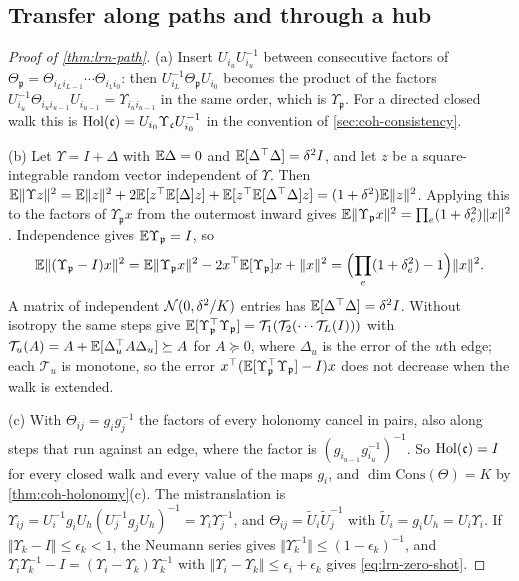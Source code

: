 \subsection{Transfer along paths and through a hub}

\begin{proof}[Proof of \cref{thm:lrn-path}]
(a) Insert $U_{i_u}U_{i_u}^{-1}$ between consecutive factors of $\Theta_{\mathfrak p}=\Theta_{i_Li_{L-1}}\cdots\Theta_{i_1i_0}$: then $U_{i_L}^{-1}\Theta_{\mathfrak p}U_{i_0}$ becomes the product of the factors $U_{i_u}^{-1}\Theta_{i_ui_{u-1}}U_{i_{u-1}}=\Upsilon_{i_ui_{u-1}}$ in the same order, which is $\Upsilon_{\mathfrak p}$. For a directed closed walk this is $\operatorname{Hol}(\mathfrak c)=U_{i_0}\Upsilon_{\mathfrak c}U_{i_0}^{-1}$ in the convention of \cref{sec:coh-consistency}.

(b) Let $\Upsilon=I+\Delta$ with $\mathbb{E}\Delta=0$ and $\mathbb{E}[\Delta^\top\Delta]=\delta^2I$, and let $z$ be a square-integrable random vector independent of $\Upsilon$. Then $\mathbb{E}\Vert\Upsilon z\Vert^2=\mathbb{E}\Vert z\Vert^2+2\mathbb{E}[z^\top\mathbb{E}[\Delta]z]+\mathbb{E}[z^\top\mathbb{E}[\Delta^\top\Delta]z]=(1+\delta^2)\mathbb{E}\Vert z\Vert^2$. Applying this to the factors of $\Upsilon_{\mathfrak p}x$ from the outermost inward gives $\mathbb{E}\Vert\Upsilon_{\mathfrak p}x\Vert^2=\prod_e(1+\delta_e^2)\Vert x\Vert^2$. Independence gives $\mathbb{E}\Upsilon_{\mathfrak p}=I$, so
\begin{equation}\label{eq:lrn-path-proof}
\mathbb{E}\Vert(\Upsilon_{\mathfrak p}-I)x\Vert^2=\mathbb{E}\Vert\Upsilon_{\mathfrak p}x\Vert^2-2x^\top\mathbb{E}[\Upsilon_{\mathfrak p}]x+\Vert x\Vert^2=\Bigl(\prod_e(1+\delta_e^2)-1\Bigr)\Vert x\Vert^2.
\end{equation}
A matrix of independent $\mathcal{N}(0,\delta^2/K)$ entries has $\mathbb{E}[\Delta^\top\Delta]=\delta^2I$. Without isotropy the same steps give $\mathbb{E}[\Upsilon_{\mathfrak p}^\top\Upsilon_{\mathfrak p}]=\mathcal T_1(\mathcal T_2(\cdots\mathcal T_L(I)))$ with $\mathcal T_u(A)=A+\mathbb{E}[\Delta_u^\top A\Delta_u]\succeq A$ for $A\succeq0$, where $\Delta_u$ is the error of the $u$th edge; each $\mathcal T_u$ is monotone, so the error $x^\top(\mathbb{E}[\Upsilon_{\mathfrak p}^\top\Upsilon_{\mathfrak p}]-I)x$ does not decrease when the walk is extended.

(c) With $\Theta_{ij}=g_ig_j^{-1}$ the factors of every holonomy cancel in pairs, also along steps that run against an edge, where the factor is $(g_{i_{u-1}}g_{i_u}^{-1})^{-1}$. So $\operatorname{Hol}(\mathfrak c)=I$ for every closed walk and every value of the maps $g_i$, and $\dim\mathrm{Cons}(\Theta)=K$ by \cref{thm:coh-holonomy}(c). The mistranslation is $\Upsilon_{ij}=U_i^{-1}g_iU_h(U_j^{-1}g_jU_h)^{-1}=\Upsilon_i\Upsilon_j^{-1}$, and $\Theta_{ij}=\tilde U_i\tilde U_j^{-1}$ with $\tilde U_i=g_iU_h=U_i\Upsilon_i$. If $\Vert\Upsilon_k-I\Vert\le\epsilon_k<1$, the Neumann series gives $\Vert\Upsilon_k^{-1}\Vert\le(1-\epsilon_k)^{-1}$, and $\Upsilon_i\Upsilon_k^{-1}-I=(\Upsilon_i-\Upsilon_k)\Upsilon_k^{-1}$ with $\Vert\Upsilon_i-\Upsilon_k\Vert\le\epsilon_i+\epsilon_k$ gives \cref{eq:lrn-zero-shot}.


\end{proof}
